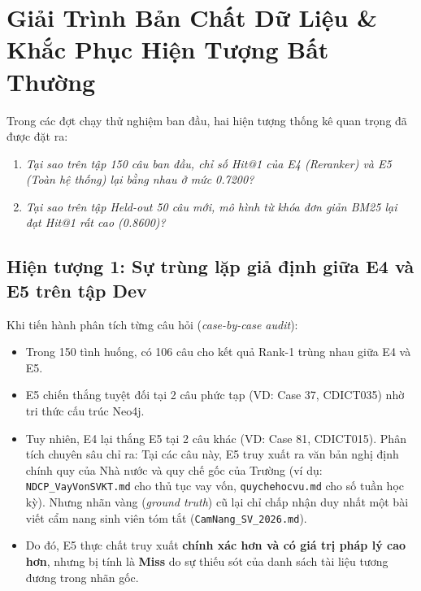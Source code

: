 \documentclass[a4paper,10pt]{article}
\begin{document}
\section{Giải Trình Bản Chất Dữ Liệu \& Khắc Phục Hiện Tượng Bất Thường}

Trong các đợt chạy thử nghiệm ban đầu, hai hiện tượng thống kê quan trọng đã được đặt ra:
\begin{enumerate}[label=(\arabic*),leftmargin=1.8em,itemsep=2pt]
    \item \textit{Tại sao trên tập 150 câu ban đầu, chỉ số Hit@1 của E4 (Reranker) và E5 (Toàn hệ thống) lại bằng nhau ở mức 0.7200?}
    \item \textit{Tại sao trên tập Held-out 50 câu mới, mô hình từ khóa đơn giản BM25 lại đạt Hit@1 rất cao (0.8600)?}
\end{enumerate}

\subsection{Hiện tượng 1: Sự trùng lặp giả định giữa E4 và E5 trên tập Dev}
\begin{warnbox}
Khi tiến hành phân tích từng câu hỏi (\textit{case-by-case audit}):
\begin{itemize}[itemsep=1.5pt,topsep=1.5pt]
    \item Trong 150 tình huống, có 106 câu cho kết quả Rank-1 trùng nhau giữa E4 và E5.
    \item E5 chiến thắng tuyệt đối tại 2 câu phức tạp (VD: Case 37, CDICT035) nhờ tri thức cấu trúc Neo4j.
    \item Tuy nhiên, E4 lại thắng E5 tại 2 câu khác (VD: Case 81, CDICT015). Phân tích chuyên sâu chỉ ra: Tại các câu này, E5 truy xuất ra văn bản nghị định chính quy của Nhà nước và quy chế gốc của Trường (ví dụ: \texttt{NDCP\_VayVonSVKT.md} cho thủ tục vay vốn, \texttt{quychehocvu.md} cho số tuần học kỳ). Nhưng nhãn vàng (\textit{ground truth}) cũ lại chỉ chấp nhận duy nhất một bài viết cẩm nang sinh viên tóm tắt (\texttt{CamNang\_SV\_2026.md}).
    \item Do đó, E5 thực chất truy xuất \textbf{chính xác hơn và có giá trị pháp lý cao hơn}, nhưng bị tính là \textbf{Miss} do sự thiếu sót của danh sách tài liệu tương đương trong nhãn gốc.
\end{itemize}
\end{warnbox}
\end{document}
